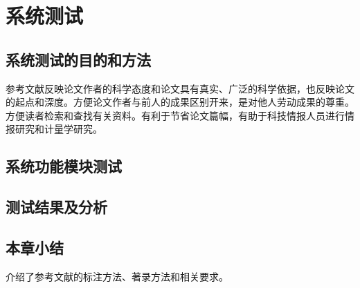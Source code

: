 \chapter{系统测试}

\section{系统测试的目的和方法}

参考文献反映论文作者的科学态度和论文具有真实、广泛的科学依据，也反映论文的起点和深度。方便论文作者与前人的成果区别开来，是对他人劳动成果的尊重。方便读者检索和查找有关资料。有利于节省论文篇幅，有助于科技情报人员进行情报研究和计量学研究。

\section{系统功能模块测试}

\section{测试结果及分析}

\section{本章小结}

介绍了参考文献的标注方法、著录方法和相关要求。










